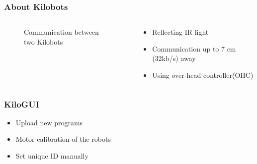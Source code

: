 \begin{frame}
	\frametitle{About Kilobots \cite{kilobotics_manual}}
	\begin{columns}
		\begin{column}{0.5\textwidth}
			\begin{figure}
				\centering
				\vspace{0.2cm}
				\caption{Communication between two Kilobots}
			\end{figure}
		\end{column}
		\begin{column}{0.5\textwidth}
			\begin{itemize}
				\item Reflecting IR light
				\item Communication up to 7 cm (32kb/s) away 
				\item Using over-head controller(OHC)
			\end{itemize}
		\end{column}
	\end{columns}
\end{frame}

\begin{frame}
	\frametitle{KiloGUI}
	\begin{itemize}
		\item Upload new programs 
		\item Motor calibration of the robots    
		\item Set unique ID manually
	\end{itemize}
\end{frame}


